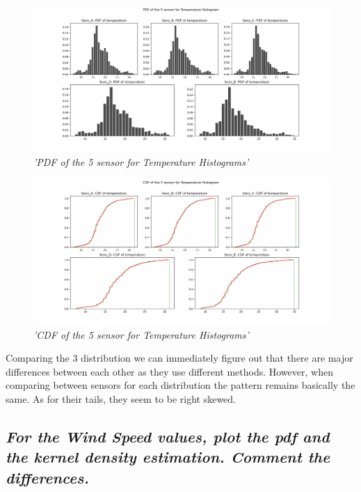 \documentclass[a4paper,12pt]{article} %
\begin{document}
\begin{figure}[H]
\centering
\includegraphics[width=\textwidth]{Graphs/PDF_of_the_5_sensor_-_Temperature_Histogram.png}
\caption{\it'PDF of the 5 sensor for Temperature Histograms'}
\end{figure}




\begin{figure}[H]
\centering
\includegraphics[width=\textwidth]{Graphs/CDF_of_the_5_sensor_-_Temperature_Histogram.png}
\caption{\it'CDF of the 5 sensor for Temperature Histograms'}
\end{figure}




Comparing the 3 distribution we can immediately figure out that there are major 
differences between each other as they use different methods. However, when comparing between sensors for each distribution the pattern remains basically the same. As for their tails, they seem to be right skewed.




\subsection{\it For the Wind Speed values, plot the pdf and the kernel density estimation. Comment the differences.}
\end{document}
